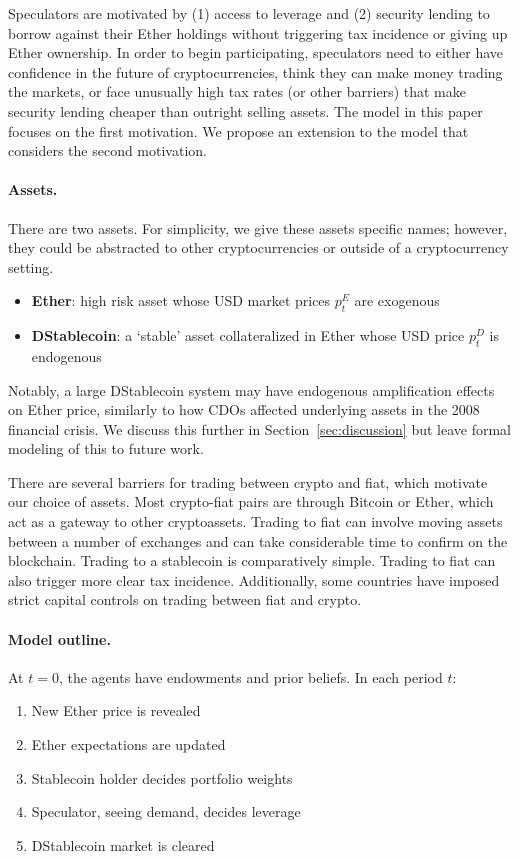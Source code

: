 Speculators are motivated by (1) access to leverage and (2) security lending to borrow against their Ether holdings without triggering tax incidence or giving up Ether ownership. In order to begin participating, speculators need to either have confidence in the future of cryptocurrencies, think they can make money trading the markets, or face unusually high tax rates (or other barriers) that make security lending cheaper than outright selling assets. The model in this paper focuses on the first motivation. We propose an extension to the model that considers the second motivation.





\paragraph{Assets.} There are two assets. For simplicity, we give these assets specific names; however, they could be abstracted to other cryptocurrencies or outside of a cryptocurrency setting.
\begin{itemize}
	\item \textbf{Ether}:  high risk asset whose USD market prices $p^E_t$ are exogenous
	\item \textbf{DStablecoin}: a `stable' asset collateralized in Ether whose USD price $p^D_t$ is endogenous
\end{itemize}

Notably, a large DStablecoin system may have endogenous amplification effects on Ether price, similarly to how CDOs affected underlying assets in the 2008 financial crisis. We discuss this further in Section~\ref{sec:discussion} but leave formal modeling of this to future work.

There are several barriers for trading between crypto and fiat, which motivate our choice of assets. Most crypto-fiat pairs are through Bitcoin or Ether, which act as a gateway to other cryptoassets. Trading to fiat can involve moving assets between a number of exchanges and can take considerable time to confirm on the blockchain. Trading to a stablecoin is comparatively simple. Trading to fiat can also trigger more clear tax incidence. Additionally, some countries have imposed strict capital controls on trading between fiat and crypto.


\paragraph{Model outline.}
At $t=0$, the agents have endowments and prior beliefs. In each period $t$:
\begin{enumerate}
	\item New Ether price is revealed
	\item Ether expectations are updated
	\item Stablecoin holder decides portfolio weights
	\item Speculator, seeing demand, decides leverage
	\item DStablecoin market is cleared
\end{enumerate}



